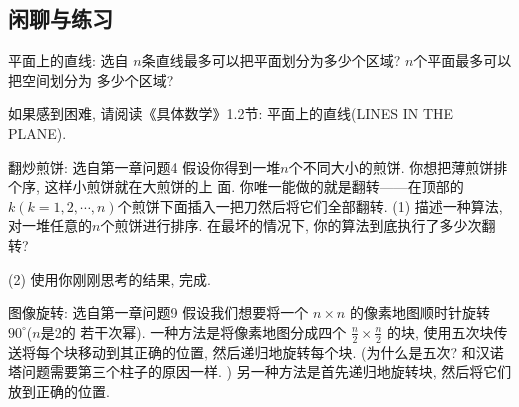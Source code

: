 \subsection*{闲聊与练习} 

    \begin{exercise}{平面上的直线: 选自\cite{knuth1989concrete}}
        $n$条直线最多可以把平面划分为多少个区域? $n$个平面最多可以把空间划分为
        多少个区域? 

        如果感到困难, 请阅读《具体数学》1.2节: 平面上的直线(LINES IN THE PLANE).
    \end{exercise}

    \begin{exercise}{翻炒煎饼: 选自\cite{algobook}第一章问题4}
    假设你得到一堆$n$个不同大小的煎饼. 你想把薄煎饼排个序, 这样小煎饼就在大煎饼的上
    面. 你唯一能做的就是翻转——在顶部的$k(k=1,2,\cdots, n)$个煎饼下面插入一把刀然后将它们全部翻转. 
    (1) 描述一种算法, 对一堆任意的$n$个煎饼进行排序. 在最坏的情况下, 你的算法到底执行了多少次翻转? 
    
    (2) 使用你刚刚思考的结果, 完成. 

    \end{exercise}

    \begin{exercise}{图像旋转: 选自\cite{algobook}第一章问题9}
        假设我们想要将一个 $n \times n$ 的像素地图顺时针旋转 $90^\circ$($n$是2的
        若干次幂). 一种方法是将像素地图分成四个 $\frac{n}{2} \times \frac{n}{2}$ 
        的块, 使用五次块传送将每个块移动到其正确的位置, 然后递归地旋转每个块. 
         (为什么是五次? 和汉诺塔问题需要第三个柱子的原因一样. ) 
        另一种方法是首先递归地旋转块, 然后将它们放到正确的位置. 
        
        
    \end{exercise}

